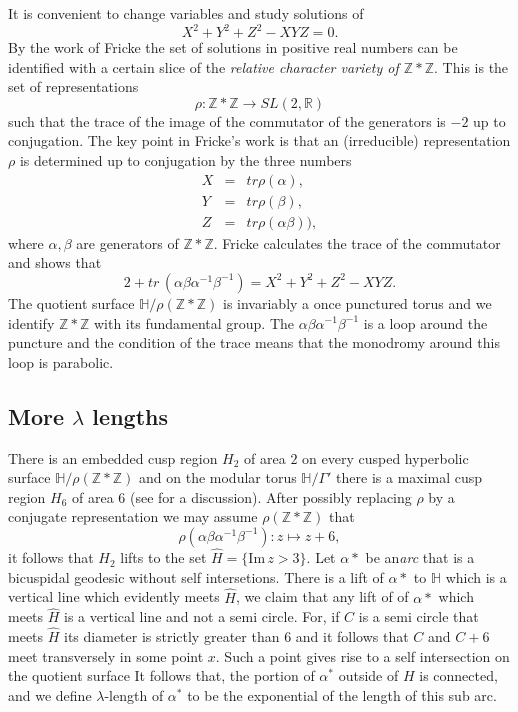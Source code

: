 \documentclass[12pt,a4paper]{amsart}
\def\HH{\mathbb{H}}
\def\im{\mathrm{Im}\,}
\def\xx{\HH/\Gamma'}
\def\ZZ{\mathbb{Z}}
\def\RR{\mathbb{R}}
\begin{document}
It is convenient to change variables and study solutions of
\begin{equation}\label{f cubic}
X^2 + Y^2 + Z^2 - XYZ = 0.
\end{equation}
By the work of Fricke the set of solutions in positive real numbers
can be identified with a certain slice of the 
\textit{relative character variety of $\ZZ * \ZZ$}.
This is the set of  representations 
$$\rho: \ZZ * \ZZ \rightarrow SL(2, \RR)$$
such that the trace of the image of the commutator of the generators is $-2$
up to conjugation.
The key point in Fricke's work is that an (irreducible) representation $\rho$
is determined up to conjugation by the three numbers
\begin{eqnarray*}
X &= &tr \rho(\alpha), \\
Y  &= &tr \rho(\beta), \\
Z &= & tr \rho(\alpha\beta)),
\end{eqnarray*}
where $\alpha,\beta$ are generators of $\ZZ*\ZZ$.
Fricke calculates the trace of the commutator and shows that
\begin{equation}
2 + tr\,  (\alpha\beta\alpha^{-1}\beta^{-1}) = X^2 + Y^2 + Z^2 - XYZ .
\end{equation}
The quotient surface $\HH/\rho(\ZZ*\ZZ)$ is invariably a once punctured torus
and we identify $\ZZ * \ZZ$ with its fundamental group.
The $\alpha\beta\alpha^{-1}\beta^{-1}$ is a loop around the puncture
and the condition of the trace means that the monodromy around this loop is parabolic.


\subsection{More $\lambda$ lengths}

There is an embedded cusp region $H_2$  of area $2$ on every cusped hyperbolic surface
$\HH/\rho(\ZZ*\ZZ)$ and on the modular torus $\xx$ there is a maximal cusp
region $H_6$ of area $6$ (see \cite{thesis} for a discussion).
After possibly replacing $\rho$ by a conjugate representation we may assume
$\rho(\ZZ*\ZZ)$  that $$\rho(\alpha\beta\alpha^{-1}\beta^{-1}): z \mapsto z +
6,$$ it follows that $H_2$ lifts to the set $\hat{H} = \{ \im z > 3 \}$. Let
$\alpha*$ be an\textit{arc} that is a bicuspidal geodesic without self
intersetions. There is a lift of $\alpha*$ to $\HH$ which is a vertical line
which evidently meets $\hat{H}$, we claim that any lift of of $\alpha*$ which
meets $\hat{H}$ is a vertical line and not a semi circle. For, if $C$ is a semi
circle that meets $\hat{H}$ its diameter is strictly greater than $6$ and it
follows that $C$ and $C + 6$ meet transversely in some point $x$. Such a point
gives rise to a self intersection on the quotient surface It follows that, the
portion of $\alpha^*$ outside of $H$ is connected, and we define
$\lambda$-length  of $\alpha^*$ to be the exponential of the length of this sub
arc.
\end{document}
